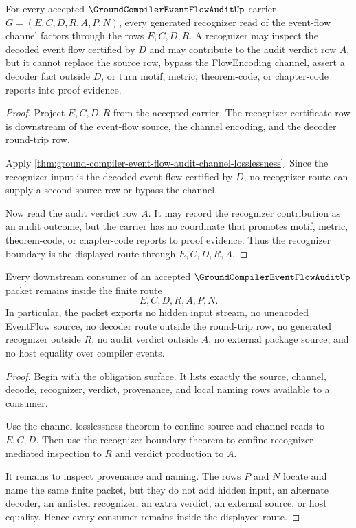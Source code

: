 \begin{theorem}
\label{thm:ground-compiler-event-flow-audit-recognizer-boundary}
For every accepted $\GroundCompilerEventFlowAuditUp$ carrier $G=(E,C,D,R,A,P,N)$, every generated recognizer read of the event-flow channel factors through the rows $E,C,D,R$. A recognizer may inspect the decoded event flow certified by $D$ and may contribute to the audit verdict row $A$, but it cannot replace the source row, bypass the FlowEncoding channel, assert a decoder fact outside $D$, or turn motif, metric, theorem-code, or chapter-code reports into proof evidence.
\end{theorem}
\begin{proof}
Project $E,C,D,R$ from the accepted carrier. The recognizer certificate row is downstream of the event-flow source, the channel encoding, and the decoder round-trip row.

Apply \autoref{thm:ground-compiler-event-flow-audit-channel-losslessness}. Since the recognizer input is the decoded event flow certified by $D$, no recognizer route can supply a second source row or bypass the channel.

Now read the audit verdict row $A$. It may record the recognizer contribution as an audit outcome, but the carrier has no coordinate that promotes motif, metric, theorem-code, or chapter-code reports to proof evidence. Thus the recognizer boundary is the displayed route through $E,C,D,R,A$.
\end{proof}

\begin{theorem}
\label{thm:ground-compiler-event-flow-audit-nonescape}
Every downstream consumer of an accepted $\GroundCompilerEventFlowAuditUp$ packet remains inside the finite route
$$
E,C,D,R,A,P,N.
$$
In particular, the packet exports no hidden input stream, no unencoded EventFlow source, no decoder route outside the round-trip row, no generated recognizer outside $R$, no audit verdict outside $A$, no external package source, and no host equality over compiler events.
\end{theorem}
\begin{proof}
Begin with the obligation surface. It lists exactly the source, channel, decode, recognizer, verdict, provenance, and local naming rows available to a consumer.

Use the channel losslessness theorem to confine source and channel reads to $E,C,D$. Then use the recognizer boundary theorem to confine recognizer-mediated inspection to $R$ and verdict production to $A$.

It remains to inspect provenance and naming. The rows $P$ and $N$ locate and name the same finite packet, but they do not add hidden input, an alternate decoder, an unlisted recognizer, an extra verdict, an external source, or host equality. Hence every consumer remains inside the displayed route.
\end{proof}

